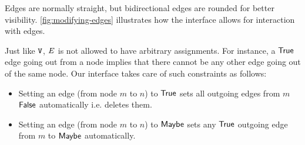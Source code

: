 Edges are normally straight, but bidirectional edges are rounded for better visibility. \autoref{fig:modifying-edges} illustrates how the interface allows for interaction with edges.

Just like $\mathtt{V}$, $E$ is not allowed to have arbitrary assignments. For instance, a $\mathsf{True}$ edge going out from a node implies that there cannot be any other edge going out of the same node. Our interface takes care of such constraints as follows:

\begin{itemize}
  \item Setting an edge (from node $m$ to $n$) to $\mathsf{True}$ sets all outgoing edges from $m$ $\mathsf{False}$ automatically i.e. deletes them.
  \item Setting an edge (from node $m$ to $n$) to $\mathsf{Maybe}$ sets any $\mathsf{True}$ outgoing edge from $m$ to $\mathsf{Maybe}$ automatically.
\end{itemize}


